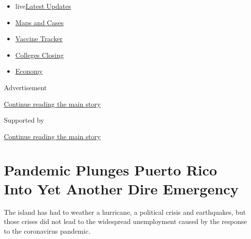 \begin{itemize}
\tightlist
\item
  live\href{https://www.nytimes3xbfgragh.onion/2020/08/21/world/covid-19-coronavirus.html?name=styln-coronavirus-national\&region=TOP_BANNER\&variant=undefined\&block=storyline_menu_recirc\&action=click\&pgtype=Article\&impression_id=3f943380-e399-11ea-8313-f9307944f60a}{Latest
  Updates}
\item
  \href{https://www.nytimes3xbfgragh.onion/interactive/2020/us/coronavirus-us-cases.html?name=styln-coronavirus-national\&region=TOP_BANNER\&variant=undefined\&block=storyline_menu_recirc\&action=click\&pgtype=Article\&impression_id=3f943381-e399-11ea-8313-f9307944f60a}{Maps
  and Cases}
\item
  \href{https://www.nytimes3xbfgragh.onion/interactive/2020/science/coronavirus-vaccine-tracker.html?name=styln-coronavirus-national\&region=TOP_BANNER\&variant=undefined\&block=storyline_menu_recirc\&action=click\&pgtype=Article\&impression_id=3f943382-e399-11ea-8313-f9307944f60a}{Vaccine
  Tracker}
\item
  \href{https://www.nytimes3xbfgragh.onion/2020/08/19/us/colleges-closing-covid.html?name=styln-coronavirus-national\&region=TOP_BANNER\&variant=undefined\&block=storyline_menu_recirc\&action=click\&pgtype=Article\&impression_id=3f943383-e399-11ea-8313-f9307944f60a}{Colleges
  Closing}
\item
  \href{https://www.nytimes3xbfgragh.onion/live/2020/08/20/business/stock-market-today-coronavirus?name=styln-coronavirus-national\&region=TOP_BANNER\&variant=undefined\&block=storyline_menu_recirc\&action=click\&pgtype=Article\&impression_id=3f943384-e399-11ea-8313-f9307944f60a}{Economy}
\end{itemize}

Advertisement

\protect\hyperlink{after-top}{Continue reading the main story}

Supported by

\protect\hyperlink{after-sponsor}{Continue reading the main story}

\hypertarget{pandemic-plunges-puerto-rico-into-yet-another-dire-emergency}{%
\section{Pandemic Plunges Puerto Rico Into Yet Another Dire
Emergency}\label{pandemic-plunges-puerto-rico-into-yet-another-dire-emergency}}

The island has had to weather a hurricane, a political crisis and
earthquakes, but those crises did not lead to the widespread
unemployment caused by the response to the coronavirus pandemic.

